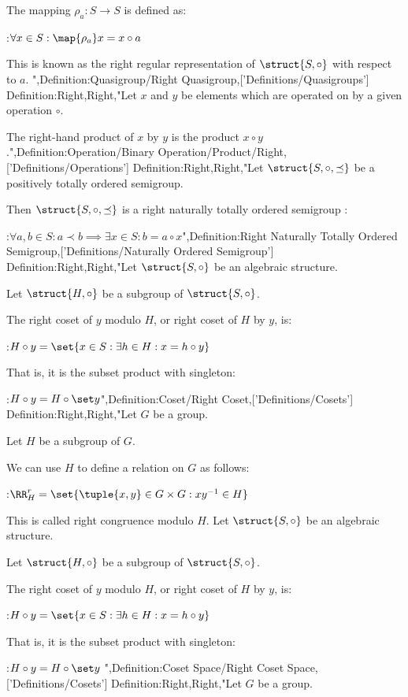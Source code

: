 The mapping $\rho_a: S \to S$ is defined as:

:$\forall x \in S: \map {\rho_a} x = x \circ a$


This is known as the right regular representation of $\struct {S, \circ}$ with respect to $a$.
",Definition:Quasigroup/Right Quasigroup,['Definitions/Quasigroups']
Definition:Right,Right,"Let $x$ and $y$ be elements which are operated on by a given operation $\circ$.

The right-hand product of $x$ by $y$ is the product $x \circ y$.",Definition:Operation/Binary Operation/Product/Right,['Definitions/Operations']
Definition:Right,Right,"Let $\struct {S, \circ, \preceq}$ be a positively totally ordered semigroup.


Then $\struct {S, \circ, \preceq}$ is a right naturally totally ordered semigroup :

:$\forall a, b \in S: a \prec b \implies \exists x \in S: b = a \circ x$",Definition:Right Naturally Totally Ordered Semigroup,['Definitions/Naturally Ordered Semigroup']
Definition:Right,Right,"Let $\struct {S, \circ}$ be an algebraic structure.

Let $\struct {H, \circ}$ be a subgroup of $\struct {S, \circ}$.


The right coset of $y$ modulo $H$, or right coset of $H$ by $y$, is:

:$H \circ y = \set {x \in S: \exists h \in H: x = h \circ y}$


That is, it is the subset product with singleton:

:$H \circ y = H \circ \set y$",Definition:Coset/Right Coset,['Definitions/Cosets']
Definition:Right,Right,"Let $G$ be a group.

Let $H$ be a subgroup of $G$.


We can use $H$ to define a relation on $G$ as follows:

:$\RR^r_H = \set {\tuple {x, y} \in G \times G: x y^{-1} \in H}$

This is called right congruence modulo $H$.
Let $\struct {S, \circ}$ be an algebraic structure.

Let $\struct {H, \circ}$ be a subgroup of $\struct {S, \circ}$.


The right coset of $y$ modulo $H$, or right coset of $H$ by $y$, is:

:$H \circ y = \set {x \in S: \exists h \in H: x = h \circ y}$


That is, it is the subset product with singleton:

:$H \circ y = H \circ \set y$
",Definition:Coset Space/Right Coset Space,['Definitions/Cosets']
Definition:Right,Right,"Let $G$ be a group.

